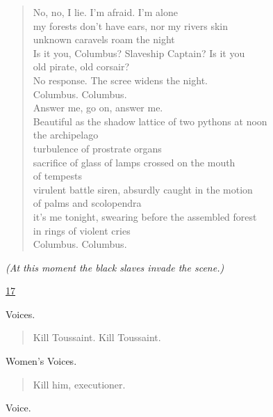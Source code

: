 \documentclass[letterpaper,article,12pt,oneside,notitlepage]{memoir}
\begin{document}
\begin{verse}
No, no, I lie. I'm afraid. I'm alone \\
my forests don't have ears, nor my rivers skin \\
unknown caravels roam the night \\
Is it you, Columbus? Slaveship Captain? Is it you \\
old pirate, old corsair? \\
No response. The scree widens the night. \\
Columbus. Columbus. \\
Answer me, go on, answer me. \\
Beautiful as the shadow lattice of two pythons at noon \\
the archipelago \\
turbulence of prostrate organs \\
sacrifice of glass of lamps crossed on the mouth \\
of tempests \\
virulent battle siren, absurdly caught in the motion \\
of palms and scolopendra \\
it's me tonight, swearing before the assembled forest \\
in rings of violent cries \\
Columbus. Columbus. \\
\end{verse}

\textit{(At this moment the black slaves invade the scene.)}

\clearpage

\href{http://cesaire.elotroalex.com/chiens/chiens/p017.html}{17}

\begin{center}Voices.\end{center}

\begin{verse}
Kill Toussaint. Kill Toussaint. \\
\end{verse}

\begin{center}Women's Voices.\end{center}

\begin{verse}
Kill him, executioner. \\
\end{verse}

\begin{center}Voice.\end{center}
\end{document}

